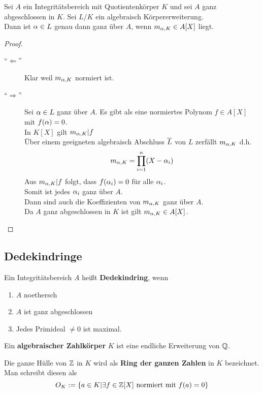	\begin{satz}
		Sei $A$ ein Integritätsbereich mit Quotientenkörper $K$ und sei $A$ ganz abgeschlossen in $K$. Sei $L/K$ ein algebraisch Körpererweiterung.\\
		Dann ist $\alpha\in L$ genau dann ganz über $A$, wenn $m_{\alpha,K}\in A[X]$ liegt.
	\end{satz}
	\begin{proof}
		\begin{description}
			\item[\enquote{$\Leftarrow$}] Klar weil $m_{\alpha,K}$ normiert ist.
			\item[\enquote{$\Rightarrow$}] Sei $\alpha\in L$ ganz über $A$. Es gibt als eine normiertes Polynom $f\in A[X]$ mit $f(\alpha)=0$.\\
			In $K[X]$ gilt $m_{\alpha,K}|f$ \\
			Über einem geeigneten algebraisch Abschluss $\overline{L}$ von $L$ zerfällt $m_{\alpha,K}$ d.h.
			\[m_{\alpha,K}=\prod_{i=1}^n(X-\alpha_i)\]
			Aus $m_{\alpha,K}|f$ folgt, dass $f(\alpha_i)=0$ für alle $\alpha_i$.\\
			Somit ist jedes $\alpha_i$ ganz über $A$.\\
			Dann sind auch die Koeffizienten von $m_{\alpha,K}$ ganz über $A$.\\
			Da $A$ ganz abgeschlossen in $K$ ist gilt $m_{\alpha,K}\in A[X]$. 
		\end{description}
	\end{proof}



\subsection{Dedekindringe}
	\begin{definition}
		Ein Integritätsbereich $A$ heißt \textbf{Dedekindring}, wenn
		\begin{enumerate}
			\item $A$ noethersch
			\item $A$ ist ganz abgeschlossen
			\item Jedes Primideal $\neq 0$ ist maximal.
		\end{enumerate}
	\end{definition}

	\begin{definition}
		Ein \textbf{algebraischer Zahlkörper} $K$ ist eine endliche Erweiterung von $\mathbb{Q}$.
	\end{definition}

	\begin{definition}
		Die ganze Hülle von $\mathbb{Z}$ in $K$ wird als \textbf{Ring der ganzen Zahlen} in $K$ bezeichnet. Man schreibt diesen als
		\[O_K:=\{a\in K|\exists f\in \mathbb{Z}[X]\text{ normiert mit }f(a)=0 \}\]
	\end{definition}

